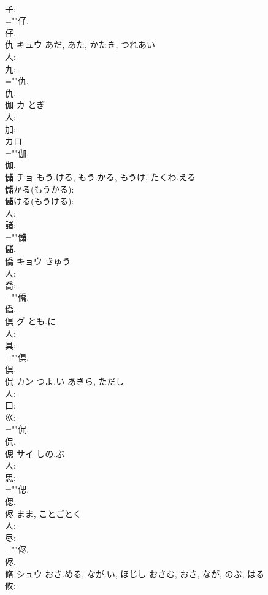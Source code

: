 \documentclass[8pt]{extreport}
\begin{document}
\begin{CJK}{UTF8}{min}
\\	子: 
\\	=""仔.
\\	仔.
\\	仇	キュウ	あだ, あた, かたき, つれあい		
\\	人: 
\\	九: 
\\	=""仇.
\\	仇.
\\	伽	カ	とぎ		
\\	人: 
\\	加: 
\\	カロ 
\\	=""伽.
\\	伽.
\\	儲	チョ	もう.ける, もう.かる, もうけ, たくわ.える		
\\	儲かる(もうかる): 
\\	儲ける(もうける): 
\\	人: 
\\	諸: 
\\	=""儲.
\\	儲.
\\	僑	キョウ		きゅう	
\\	人: 
\\	喬: 
\\	=""僑.
\\	僑.
\\	倶	グ	とも.に		
\\	人: 
\\	具: 
\\	=""倶.
\\	倶.
\\	侃	カン	つよ.い	あきら, ただし	
\\	人: 
\\	口: 
\\	巛: 
\\	=""侃.
\\	侃.
\\	偲	サイ	しの.ぶ		
\\	人: 
\\	思: 
\\	=""偲.
\\	偲.
\\	侭		まま, ことごとく				
\\	人: 
\\	尽: 
\\	=""侭.
\\	侭.
\\	脩	シュウ	おさ.める, なが.い, ほじし	おさむ, おさ, なが, のぶ, はる	
\\	攸: 

\end{CJK}
\end{document}
